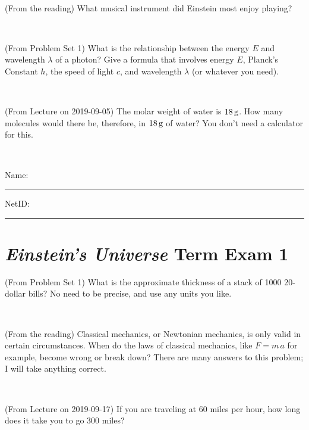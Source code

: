 \documentclass[12pt, letterpaper]{article}
\begin{document}
\vfill ~

\begin{problem} (From the reading)
What musical instrument did Einstein most enjoy playing?
\end{problem}


\vfill ~

\begin{problem} (From Problem Set 1)
What is the relationship between the energy $E$ and wavelength
$\lambda$ of a photon? Give a formula that involves energy $E$,
Planck's Constant $h$, the speed of light $c$, and wavelength
$\lambda$ (or whatever you need).
\end{problem}

\vfill ~

\begin{problem} (From Lecture on 2019-09-05)
The molar weight of water is $18\,\mathrm{g}$. How many molecules would there
be, therefore, in $18\,\mathrm{g}$ of water? You don't need a calculator for
this.
\end{problem}


\vfill ~


\cleardoublepage



\noindent
Name: \rule[-1ex]{0.60\textwidth}{0.1pt}
NetID: \rule[-1ex]{0.20\textwidth}{0.1pt}

\section*{\textsl{Einstein's Universe} Term Exam 1}
\setcounter{problem}{1}


\begin{problem} (From Problem Set 1)
What is the approximate thickness of a stack of 1000 20-dollar bills?
No need to be precise, and use any units you like.
\end{problem}


\vfill ~

\begin{problem} (From the reading)
Classical mechanics, or Newtonian mechanics, is only valid in certain
circumstances. When do the laws of classical mechanics, like $F =
m\,a$ for example, become wrong or break down? There are many answers
to this problem; I will take anything correct.
\end{problem}


\vfill ~

\begin{problem} (From Lecture on 2019-09-17)
If you are traveling at 60 miles per hour, how long does
it take you to go 300 miles?
\end{problem}
\end{document}
